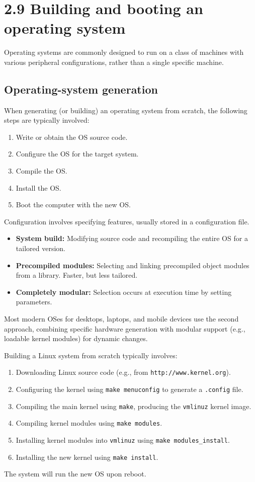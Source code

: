 \section*{2.9 Building and booting an operating system}

Operating systems are commonly designed to run on a class of machines with various peripheral configurations, rather than a single specific machine.

\subsection*{Operating-system generation}
When generating (or building) an operating system from scratch, the following steps are typically involved:
\begin{enumerate}
    \item Write or obtain the OS source code.
    \item Configure the OS for the target system.
    \item Compile the OS.
    \item Install the OS.
    \item Boot the computer with the new OS.
\end{enumerate}
Configuration involves specifying features, usually stored in a configuration file.
\begin{itemize}
    \item \textbf{System build:} Modifying source code and recompiling the entire OS for a tailored version.
    \item \textbf{Precompiled modules:} Selecting and linking precompiled object modules from a library. Faster, but less tailored.
    \item \textbf{Completely modular:} Selection occurs at execution time by setting parameters.
\end{itemize}
Most modern OSes for desktops, laptops, and mobile devices use the second approach, combining specific hardware generation with modular support (e.g., loadable kernel modules) for dynamic changes.

Building a Linux system from scratch typically involves:
\begin{enumerate}
    \item Downloading Linux source code (e.g., from \texttt{http://www.kernel.org}).
    \item Configuring the kernel using \texttt{make menuconfig} to generate a \texttt{.config} file.
    \item Compiling the main kernel using \texttt{make}, producing the \texttt{vmlinuz} kernel image.
    \item Compiling kernel modules using \texttt{make modules}.
    \item Installing kernel modules into \texttt{vmlinuz} using \texttt{make modules\_install}.
    \item Installing the new kernel using \texttt{make install}.
\end{enumerate}
The system will run the new OS upon reboot.

